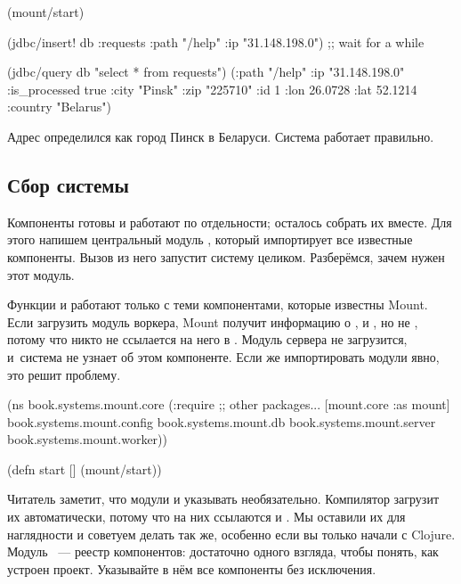 \else

\begin{clojure}
(mount/start)

(jdbc/insert! db :requests
              {:path "/help" :ip "31.148.198.0"})
;; wait for a while

(jdbc/query db "select * from requests")
({:path "/help" :ip "31.148.198.0" :is_processed true
  :city "Pinsk" :zip "225710" :id 1
  :lon 26.0728 :lat 52.1214 :country "Belarus"})
\end{clojure}

\fi

Адрес  определился как город Пинск в Беларуси. Система
работает правильно.

\subsection{Сбор системы}


Компоненты готовы и работают по отдельности; осталось собрать их вместе. Для
этого напишем центральный модуль , который импортирует все известные
компоненты. Вызов  из него запустит систему
целиком. Разберёмся, зачем нужен этот модуль.

Функции  и  работают только с теми компонентами, которые
известны Mount. Если загрузить модуль воркера, Mount получит информацию о
,  и , но не , потому что никто
не ссылается на него в . Модуль сервера не загрузится, и~система
не узнает об этом компоненте. Если же импортировать модули явно, это решит
проблему.

\label{mount-main}

\begin{clojure}
(ns book.systems.mount.core
  (:require
   ;; other packages...
   [mount.core :as mount]
   book.systems.mount.config
   book.systems.mount.db
   book.systems.mount.server
   book.systems.mount.worker))

(defn start []
  (mount/start))
\end{clojure}

Читатель заметит, что модули  и  указывать
необязательно. Компилятор загрузит их автоматически, потому что на них ссылаются
 и . Мы оставили их для наглядности и советуем делать
так же, особенно если вы только начали с Clojure. Модуль ~--- реестр
компонентов: достаточно одного взгляда, чтобы понять, как устроен
проект. Указывайте в нём все компоненты без исключения.

